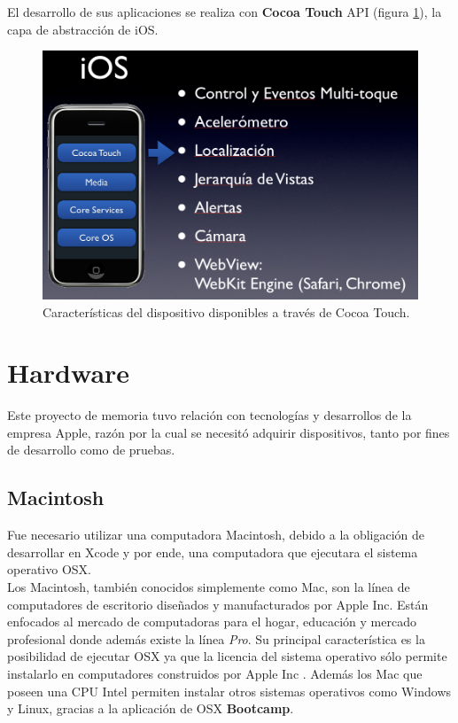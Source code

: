 El desarrollo de sus aplicaciones se realiza con \textbf{Cocoa Touch} API (figura \ref{fig:ios-cocoatouch}), la capa de abstracción de iOS.
\begin{figure}[H]
	\centering
	\includegraphics[scale=0.35]{imgs/ios-cocoatouch.png} 
	\caption{Características del dispositivo disponibles a través de Cocoa Touch.}
	\label{fig:ios-cocoatouch}
\end{figure}  


	\section{Hardware}
		Este proyecto de memoria tuvo relación con tecnologías y desarrollos de la empresa Apple, razón por la cual se necesitó adquirir dispositivos, tanto por fines de desarrollo como de pruebas.
		\subsection{Macintosh}
		Fue necesario utilizar una computadora Macintosh, debido a la obligación de desarrollar en Xcode y por ende, una computadora que ejecutara el sistema operativo OSX.\\
		
		Los Macintosh, también conocidos simplemente como Mac, son la línea de computadores de escritorio diseñados y manufacturados por Apple Inc. Están enfocados al mercado de computadoras para el hogar, educación y mercado profesional donde además existe la línea \textit{Pro}. Su principal característica es la posibilidad de ejecutar OSX ya que la licencia del sistema operativo sólo permite instalarlo en computadores construidos por Apple Inc \cite{web:license-osx}. Además los Mac que poseen una CPU Intel permiten instalar otros sistemas operativos como Windows y Linux, gracias a la aplicación de OSX \textbf{Bootcamp}.\\
		
